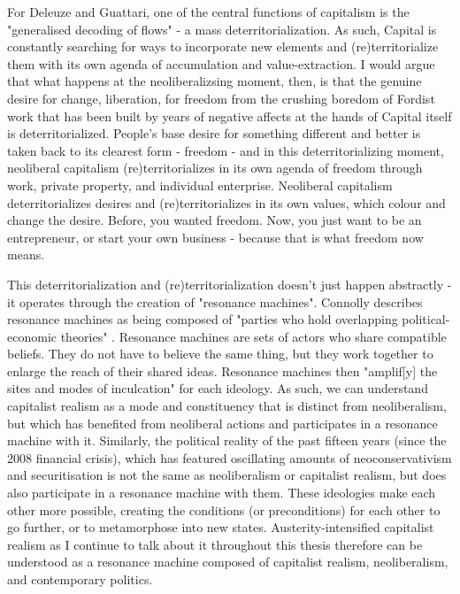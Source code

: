 For Deleuze and Guattari, one of the central functions of capitalism is the "generalised decoding of flows" \citep[153]{deleuze_anti-oedipus:_1983} - a mass deterritorialization. As such, Capital is constantly searching for ways to incorporate new elements and (re)territorialize them with its own agenda of accumulation and value-extraction. I would argue that what happens at the neoliberalizsing moment, then, is that the genuine desire for change, liberation, for freedom from the crushing boredom of Fordist work that has been built by years of negative affects at the hands of Capital itself is deterritorialized. People's base desire for something different and better is taken back to its clearest form - freedom - and in this deterritorializing moment, neoliberal capitalism (re)territorializes in its own agenda of freedom through work, private property, and individual enterprise. Neoliberal capitalism deterritorializes desires and (re)territorializes in its own values, which colour and change the desire. Before, you wanted freedom. Now, you just want to be an entrepreneur, or start your own business - because that is what freedom now means.

This deterritorialization and (re)territorialization doesn't just happen abstractly - it operates through the creation of "resonance machines". Connolly describes resonance machines as being composed of "parties who hold overlapping political-economic theories" \citep[68]{connolly_fragility_2013}. Resonance machines are sets of actors who share compatible beliefs. They do not have to believe the same thing, but they work together to enlarge the reach of their shared ideas. Resonance machines then "amplif[y] the sites and modes of inculcation" for each ideology. As such, we can understand capitalist realism as a mode and constituency that is distinct from neoliberalism, but which has benefited from neoliberal actions and participates in a resonance machine with it. Similarly, the political reality of the past  fifteen years (since the 2008 financial crisis), which has featured oscillating amounts of neoconservativism and securitisation is not the same as neoliberalism or capitalist realism, but does also participate in a resonance machine with them. These ideologies make each other more possible, creating the conditions (or preconditions) for each other to go further, or to metamorphose into new states. Austerity-intensified capitalist realism as I continue to talk about it throughout this thesis therefore can be understood as a resonance machine composed of capitalist realism, neoliberalism, and contemporary politics. 

